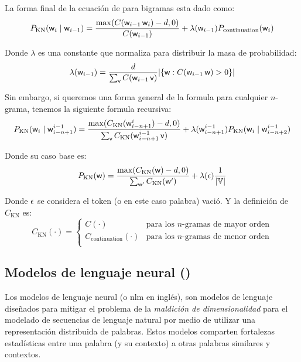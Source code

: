 La forma final de la ecuación de  para bigramas esta dado como:
\begin{equation}
  P_{\mathrm{KN}}({\mathit{\mathsf{w}}}_i \mid {\mathit{\mathsf{w}}}_{i-1}) = \frac{ \max(C({\mathit{\mathsf{w}}}_{i-1} \, {\mathit{\mathsf{w}}}_{i}) -d, 0) }{C({\mathit{\mathsf{w}}}_{i-1})} + \lambda({\mathit{\mathsf{w}}}_{i-1}) P_{\mathrm{continuation}}({\mathit{\mathsf{w}}}_i)
\end{equation}

Donde $\lambda$ es una constante que normaliza para distribuir la masa de probabilidad:
\begin{equation}
  \lambda({\mathit{\mathsf{w}}}_{i-1}) = \frac{d}{ \sum_{{\mathit{\mathsf{v}}}} C({\mathit{\mathsf{w}}}_{i-1} \, {\mathit{\mathsf{v}}}) } | \{ {\mathit{\mathsf{w}}} : C({\mathit{\mathsf{w}}}_{i-1} \, {\mathit{\mathsf{w}}}) > 0 \} |
\end{equation}

Sin embargo, si queremos una forma general de la formula para cualquier $n$-grama, tenemos la siguiente formula recursiva:
\begin{equation}
  P_{\mathrm{KN}}({\mathit{\mathsf{w}}}_i \mid {\mathit{\mathsf{w}}}_{i-n+1}^{i-1}) = \frac{ \max(C_{\mathrm{KN}}({\mathit{\mathsf{w}}}_{i-n+1}^{i}) -d, 0) }{\sum_{\mathit{\mathsf{v}}} C_{\mathrm{KN}}({\mathit{\mathsf{w}}}_{i-n+1}^{i-1} \, {\mathit{\mathsf{v}}})} + \lambda({\mathit{\mathsf{w}}}_{i-n+1}^{i-1}) P_{\mathrm{KN}}({\mathit{\mathsf{w}}}_i \mid {\mathit{\mathsf{w}}}_{i-n+2}^{i-1})
\end{equation}

Donde su caso base es:
\begin{equation}
  P_{\mathrm{KN}}({\mathit{\mathsf{w}}}) = \frac{ \max(C_{\mathrm{KN}}({\mathit{\mathsf{w}}}) -d, 0) }{\sum_{{\mathit{\mathsf{w}}}^{\prime}} C_{\mathrm{KN}}({\mathit{\mathsf{w}}}^{\prime})} + \lambda({\epsilon}) \frac{1}{|{\mathbb{V}}|}
\end{equation}

Donde ${\epsilon}$ se considera el token (o en este caso palabra) vació. Y la definición de $C_{\mathrm{KN}}$ es:
\begin{equation}
  C_{\mathrm{KN}}(\cdot) = \left\{ \begin{array}{ll}
            C(\cdot) & \text{para los $n$-gramas de mayor orden} \\
            C_{\mathrm{continuation}}(\cdot) & \text{para los $n$-gramas de menor orden} \\
          \end{array} \right.
\end{equation}


\subsection{Modelos de lenguaje neural ()}
Los modelos de lenguaje neural (o \gls{nlm} en inglés), son modelos de lenguaje diseñados para mitigar el problema de la \textit{maldición de dimensionalidad} para el modelado de secuencias de lenguaje natural por medio de utilizar una representación distribuida de palabras. Estos modelos comparten fortalezas estadísticas entre una palabra (y su contexto) a otras palabras similares y contextos.

